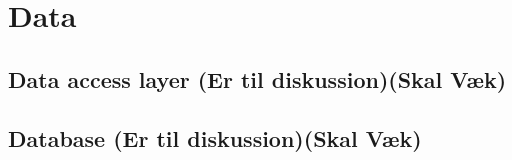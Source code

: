 \chapter{Data}

\section{Data access layer (Er til diskussion)(Skal Væk)}

\section{Database (Er til diskussion)(Skal Væk)}



